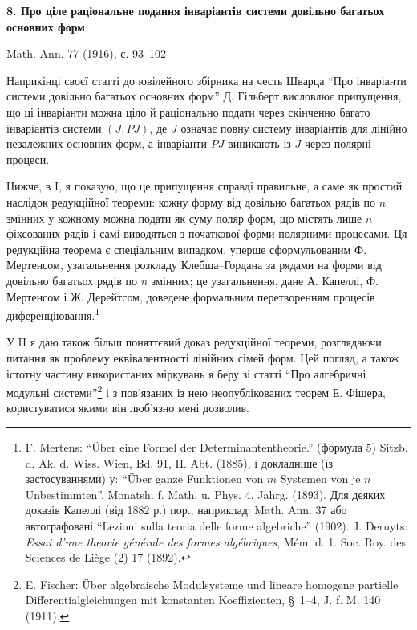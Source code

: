 \documentclass[11pt]{article}
\begin{document}
\begin{center}
{\Large\bfseries 8. Про ціле раціональне подання інваріантів системи довільно багатьох основних форм}\par
\vspace{1.2em}
Math. Ann. 77 (1916), с. 93--102
\end{center}

\vspace{1em}

Наприкінці своєї статті до ювілейного збірника на честь Шварца ``Про інваріанти системи довільно багатьох основних форм'' Д. Гільберт висловлює припущення, що ці інваріанти можна ціло й раціонально подати через скінченно багато інваріантів системи $(J,PJ)$, де $J$ означає повну систему інваріантів для лінійно незалежних основних форм, а інваріанти $PJ$ виникають із $J$ через полярні процеси.

Нижче, в I, я показую, що це припущення справді правильне, а саме як простий наслідок редукційної теореми: кожну форму від довільно багатьох рядів по $n$ змінних у кожному можна подати як суму поляр форм, що містять лише $n$ фіксованих рядів і самі виводяться з початкової форми полярними процесами. Ця редукційна теорема є спеціальним випадком, уперше сформульованим Ф. Мертенсом, узагальнення розкладу Клебша--Гордана за рядами на форми від довільно багатьох рядів по $n$ змінних; це узагальнення, дане А. Капеллі, Ф. Мертенсом і Ж. Дерейтсом, доведене формальним перетворенням процесів диференціювання.\footnote{F. Mertens: ``Über eine Formel der Determinantentheorie.'' (формула 5) Sitzb. d. Ak. d. Wiss. Wien, Bd. 91, II. Abt. (1885), і докладніше (із застосуваннями) у: ``Über ganze Funktionen von $m$ Systemen von je $n$ Unbestimmten''. Monatsh. f. Math. u. Phys. 4. Jahrg. (1893). Для деяких доказів Капеллі (від 1882 р.) пор., наприклад: Math. Ann. 37 або автографовані ``Lezioni sulla teoria delle forme algebriche'' (1902). J. Deruyts: \emph{Essai d'une theorie générale des formes algébriques}, Mém. d. 1. Soc. Roy. des Sciences de Liège (2) 17 (1892).}

У II я даю також більш поняттєвий доказ редукційної теореми, розглядаючи питання як проблему еквівалентності лінійних сімей форм. Цей погляд, а також істотну частину використаних міркувань я беру зі статті ``Про алгебричні модульні системи''\footnote{E. Fischer: Über algebraische Modulsysteme und lineare homogene partielle Differentialgleichungen mit konstanten Koeffizienten, \S\ 1--4, J. f. M. 140 (1911).} і з пов'язаних із нею неопублікованих теорем Е. Фішера, користуватися якими він люб'язно мені дозволив.
\end{document}
